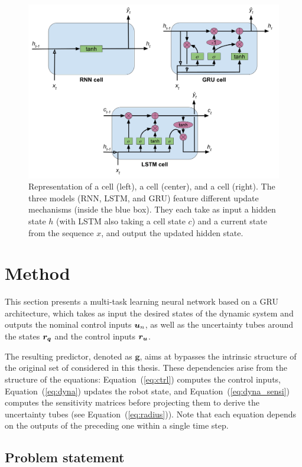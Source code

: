 \begin{figure} [t]
    \centering
    \includegraphics[width=0.8\linewidth]{figures/learning_quadrotor/cells.png}%
    \caption{Representation of a  cell (left), a  cell (center), and a  cell (right).
    The three models (RNN, LSTM, and GRU) feature different update mechanisms (inside the blue box). They each take as input a hidden state $h$ (with LSTM also taking a cell state $c$) and a current state from the sequence $x$, and output the updated hidden state.
    }%
    \label{fig:rnns}%
\end{figure}

\section{Method} \label{sec:method}

This section presents a multi-task learning neural network based on a GRU architecture, which takes as input the desired states of the dynamic system and outputs the nominal control inputs $\boldsymbol{u}_n$, as well as the uncertainty tubes around the states $\boldsymbol{r_q}$ and the control inputs $\boldsymbol{r_u}$. 

The resulting predictor, denoted as $\boldsymbol{g}$, aims at bypasses the intrinsic structure of the original set of  considered in this thesis. 
These dependencies arise from the structure of the equations: Equation~(\ref{eq:ctrl}) computes the control inputs, Equation~(\ref{eq:dyna}) updates the robot state, and Equation~(\ref{eq:dyna_sensi}) computes the sensitivity matrices before projecting them to derive the uncertainty tubes (see Equation~(\ref{eq:radius})). 
Note that each equation depends on the outputs of the preceding one within a single time step.

\subsection{Problem statement}

